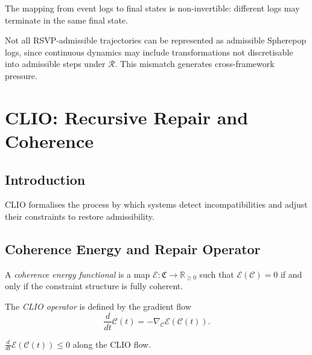 \documentclass[11pt,openany]{book}
\begin{document}
\begin{proposition}
\label{prop:noninvertible-log}\label{prop:failure-coherence}\label{prop:failure-coherence}
The mapping from event logs to final states is
non-invertible: different logs may terminate in the same
final state.
\end{proposition}

\begin{proposition}
\label{prop:mismatch}
Not all RSVP-admissible trajectories can be represented
as admissible Spherepop logs, since continuous dynamics
may include transformations not discretisable into
admissible steps under $\mathcal{R}$. This mismatch
generates cross-framework pressure.
\end{proposition}


\chapter{CLIO: Recursive Repair and Coherence}
\label{ch:clio}

\section{Introduction}
\label{sec:introduction-clio}

CLIO formalises the process by which systems detect
incompatibilities and adjust their constraints to restore
admissibility.

\section{Coherence Energy and Repair Operator}
\label{sec:energy}

\begin{definition}
\label{def:coherence-energy}
A \emph{coherence energy functional} is a map
$\mathcal{E} : \mathfrak{C} \to \mathbb{R}_{\ge 0}$
such that $\mathcal{E}(\mathcal{C}) = 0$ if and only if
the constraint structure is fully coherent.
\end{definition}

\begin{definition}
\label{def:clio-operator}
The \emph{CLIO operator} is defined by the gradient flow
\[
  \frac{d}{dt} \mathcal{C}(t)
    = - \nabla_{\mathcal{C}} \mathcal{E}(\mathcal{C}(t)).
\]
\end{definition}

\begin{proposition}
\label{prop:descent}
$\frac{d}{dt} \mathcal{E}(\mathcal{C}(t)) \le 0$
along the CLIO flow.
\end{proposition}
\end{document}

